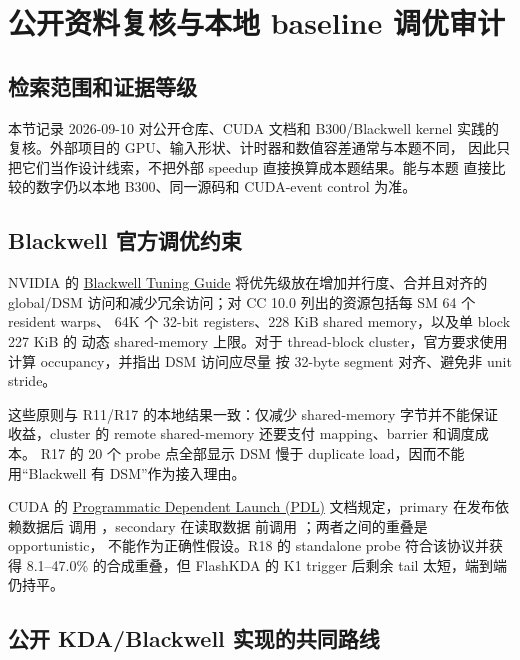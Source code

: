 \section{公开资料复核与本地 baseline 调优审计}

\subsection{检索范围和证据等级}

本节记录 2026-09-10 对公开仓库、CUDA 文档和 B300/Blackwell kernel
实践的复核。外部项目的 GPU、输入形状、计时器和数值容差通常与本题不同，
因此只把它们当作设计线索，不把外部 speedup 直接换算成本题结果。能与本题
直接比较的数字仍以本地 B300、同一源码和 CUDA-event control 为准。

\subsection{Blackwell 官方调优约束}

NVIDIA 的 \href{https://docs.nvidia.com/cuda/archive/13.0.0/blackwell-tuning-guide/index.html}
{Blackwell Tuning Guide} 将优先级放在增加并行度、合并且对齐的 global/DSM
访问和减少冗余访问；对 CC 10.0 列出的资源包括每 SM 64 个 resident warps、
64K 个 32-bit registers、228 KiB shared memory，以及单 block 227 KiB 的
动态 shared-memory 上限。对于 thread-block cluster，官方要求使用
 计算 occupancy，并指出 DSM 访问应尽量
按 32-byte segment 对齐、避免非 unit stride。

这些原则与 R11/R17 的本地结果一致：仅减少 shared-memory 字节并不能保证
收益，cluster 的 remote shared-memory 还要支付 mapping、barrier 和调度成本。
R17 的 20 个 probe 点全部显示 DSM 慢于 duplicate load，因而不能用“Blackwell
有 DSM”作为接入理由。

CUDA 的 \href{https://docs.nvidia.com/cuda/cuda-programming-guide/04-special-topics/programmatic-dependent-launch.html}
{Programmatic Dependent Launch (PDL)} 文档规定，primary 在发布依赖数据后
调用 ，secondary 在读取数据
前调用 ；两者之间的重叠是 opportunistic，
不能作为正确性假设。R18 的 standalone probe 符合该协议并获得 8.1--47.0\%
的合成重叠，但 FlashKDA 的 K1 trigger 后剩余 tail 太短，端到端仍持平。

\subsection{公开 KDA/Blackwell 实现的共同路线}

